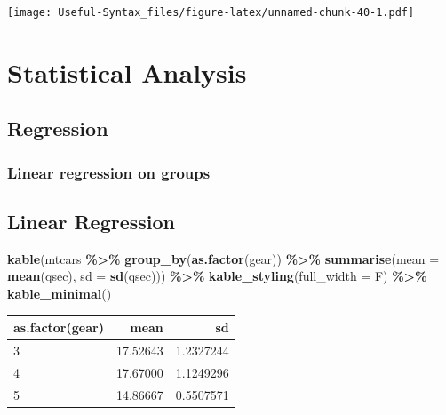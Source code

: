 \documentclass[
]{article}
\newenvironment{Shaded}{\begin{snugshade}}{\end{snugshade}}
\newcommand{\AttributeTok}[1]{\textcolor[rgb]{0.13,0.29,0.53}{#1}}
\newcommand{\FunctionTok}[1]{\textcolor[rgb]{0.13,0.29,0.53}{\textbf{#1}}}
\newcommand{\NormalTok}[1]{#1}
\newcommand{\SpecialCharTok}[1]{\textcolor[rgb]{0.81,0.36,0.00}{\textbf{#1}}}
\begin{document}
\texttt{[image: Useful-Syntax\_files/figure-latex/unnamed-chunk-40-1.pdf]}

\hypertarget{statistical-analysis}{%
\section{Statistical Analysis}\label{statistical-analysis}}

\hypertarget{regression}{%
\subsection{Regression}\label{regression}}

\hypertarget{linear-regression-on-groups}{%
\subsubsection{Linear regression on groups}\label{linear-regression-on-groups}}

\hypertarget{linear-regression}{%
\subsection{Linear Regression}\label{linear-regression}}

\begin{Shaded}
\begin{Highlighting}[]
\FunctionTok{kable}\NormalTok{(mtcars }\SpecialCharTok{\%\textgreater{}\%}  \FunctionTok{group\_by}\NormalTok{(}\FunctionTok{as.factor}\NormalTok{(gear)) }\SpecialCharTok{\%\textgreater{}\%}
\FunctionTok{summarise}\NormalTok{(}\AttributeTok{mean =} \FunctionTok{mean}\NormalTok{(qsec), }\AttributeTok{sd =} \FunctionTok{sd}\NormalTok{(qsec))) }\SpecialCharTok{\%\textgreater{}\%}
  \FunctionTok{kable\_styling}\NormalTok{(}\AttributeTok{full\_width =}\NormalTok{ F) }\SpecialCharTok{\%\textgreater{}\%}
  \FunctionTok{kable\_minimal}\NormalTok{()}
\end{Highlighting}
\end{Shaded}

\begin{table}
\centering
\begin{tabular}{l|r|r}
\hline
as.factor(gear) & mean & sd\\
\hline
3 & 17.52643 & 1.2327244\\
\hline
4 & 17.67000 & 1.1249296\\
\hline
5 & 14.86667 & 0.5507571\\
\hline
\end{tabular}
\end{table}
\end{document}
